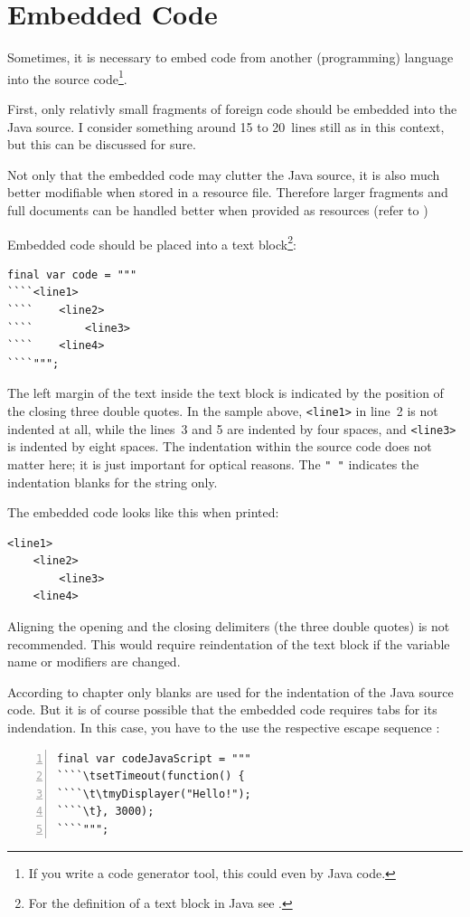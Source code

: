 \chapter{Embedded Code}\label{sec:EmbeddedCode}
Sometimes, it is necessary to embed code from another (programming) language into the \Java source code\footnote{If you write a code generator tool, this could even by Java code.}.

First, only relativly small fragments of foreign code should be embedded into the Java source. I consider something around 15 to 20~lines still as  in this context, but this can be discussed for sure.

Not only that the embedded code may clutter the Java source, it is also much better modifiable when stored in a resource file. Therefore larger fragments and full documents can be handled better when provided as resources (refer to )

Embedded code should be placed into a text block\footnote{For the definition of a text block in Java see \autocite{ORACLE_DOC_LANGUAGE_SPECIFICATION:TextBlocks}.}:
\begin{lstlisting}
final var code = """
````<line1>
````    <line2>
````        <line3>
````    <line4>
````""";
\end{lstlisting}

The left margin of the text inside the text block is indicated by the position of the closing three double quotes. In the sample above, \texttt{<line1>} in line~2 is not indented at all, while the lines~3 and 5 are indented by four spaces, and \texttt{<line3>} is indented by eight spaces. The indentation within the source code does not matter here; it is just important for optical reasons. The \lstinline|" "| indicates the indentation blanks for the string only.

The embedded code looks like this when printed:
\begin{lstlisting}[language={}]
<line1>
    <line2>
        <line3>
    <line4>
\end{lstlisting}

Aligning the opening and the closing delimiters (the three double quotes) is not recommended. This would require reindentation of the text block if the variable name or modifiers are changed.

According to chapter  only blanks are used for the indentation of the Java source code. But it is of course possible that the embedded code requires tabs for its indendation.
In this case, you have to the use the respective escape sequence \bdq{\lstinline|\\t|}:
\begin{lstlisting}[numbers=left]
final var codeJavaScript = """
````\tsetTimeout(function() {
````\t\tmyDisplayer("Hello!");
````\t}, 3000);
````""";
\end{lstlisting}

